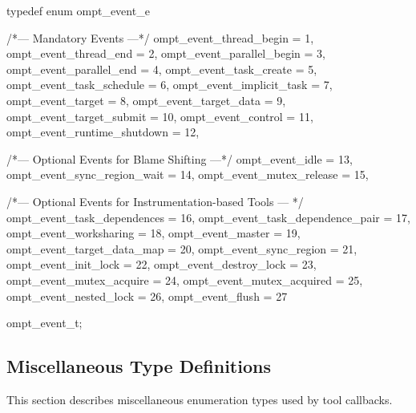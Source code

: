 \documentclass{article}
\begin{document}
\begin{boxedcode}
typedef enum ompt\_event\_e {  
  /*--- Mandatory Events ---*/
  ompt\_event\_thread\_begin             = 1,
  ompt\_event\_thread\_end               = 2,
  ompt\_event\_parallel\_begin           = 3,
  ompt\_event\_parallel\_end             = 4,
  ompt\_event\_task\_create              = 5,
  ompt\_event\_task\_schedule            = 6,
  ompt\_event\_implicit\_task            = 7,
  ompt\_event\_target                   = 8,
  ompt\_event\_target\_data              = 9,
  ompt\_event\_target\_submit            = 10,
  ompt\_event\_control                  = 11,
  ompt\_event\_runtime\_shutdown         = 12,

  /*--- Optional Events for Blame Shifting ---*/
  ompt\_event\_idle                     = 13,
  ompt\_event\_sync\_region\_wait         = 14,
  ompt\_event\_mutex\_release            = 15,

  /*--- Optional Events for Instrumentation-based Tools --- */
  ompt\_event\_task\_dependences         = 16,
  ompt\_event\_task\_dependence\_pair     = 17,
  ompt\_event\_worksharing              = 18,
  ompt\_event\_master                   = 19,
  ompt\_event\_target\_data\_map          = 20,
  ompt\_event\_sync\_region              = 21,
  ompt\_event\_init\_lock                = 22,
  ompt\_event\_destroy\_lock             = 23,
  ompt\_event\_mutex\_acquire            = 24,
  ompt\_event\_mutex\_acquired           = 25,
  ompt\_event\_nested\_lock              = 26,
  ompt\_event\_flush                    = 27
} ompt\_event\_t;
\end{boxedcode}

\clearpage  
\subsection{Miscellaneous Type Definitions}
\label{appendix:ompt-types:misc}
This section describes miscellaneous enumeration types used by tool callbacks.
\end{document}

